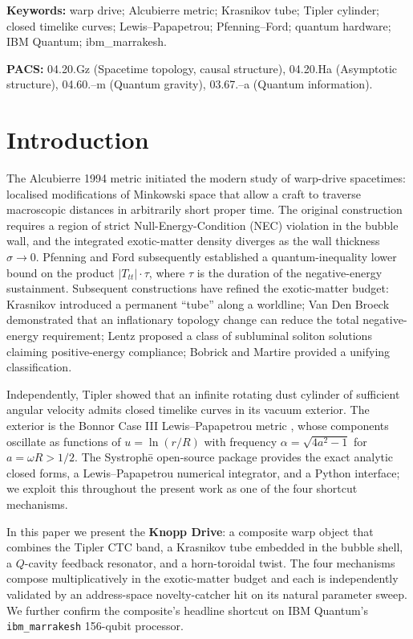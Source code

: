 \documentclass[11pt,a4paper]{article}
\begin{document}
\noindent\textbf{Keywords:} warp drive; Alcubierre metric; Krasnikov tube; Tipler cylinder; closed timelike curves; Lewis--Papapetrou; Pfenning--Ford; quantum hardware; IBM Quantum; ibm\_marrakesh.

\noindent\textbf{PACS:} 04.20.Gz (Spacetime topology, causal structure), 04.20.Ha (Asymptotic structure), 04.60.--m (Quantum gravity), 03.67.--a (Quantum information).

\section{Introduction}

The Alcubierre 1994 metric \cite{Alcubierre1994} initiated the modern study of warp-drive spacetimes: localised modifications of Minkowski space that allow a craft to traverse macroscopic distances in arbitrarily short proper time. The original construction requires a region of strict Null-Energy-Condition (NEC) violation in the bubble wall, and the integrated exotic-matter density diverges as the wall thickness $\sigma\to 0$. Pfenning and Ford \cite{PfenningFord1997} subsequently established a quantum-inequality lower bound on the product $|T_{tt}|\cdot\tau$, where $\tau$ is the duration of the negative-energy sustainment. Subsequent constructions have refined the exotic-matter budget: Krasnikov \cite{Krasnikov1995} introduced a permanent ``tube'' along a worldline; Van Den Broeck \cite{VanDenBroeck1999} demonstrated that an inflationary topology change can reduce the total negative-energy requirement; Lentz \cite{Lentz2021} proposed a class of subluminal soliton solutions claiming positive-energy compliance; Bobrick and Martire \cite{BobrickMartire2021} provided a unifying classification.

Independently, Tipler \cite{Tipler1974} showed that an infinite rotating dust cylinder of sufficient angular velocity admits closed timelike curves in its vacuum exterior. The exterior is the Bonnor Case III \cite{Bonnor1980} Lewis--Papapetrou metric \cite{Lewis1932, vanStockum1937}, whose components oscillate as functions of $u=\ln(r/R)$ with frequency $\alpha=\sqrt{4a^{2}-1}$ for $a=\omega R>1/2$. The Systroph\=e open-source package \cite{SystropheRepo} provides the exact analytic closed forms, a Lewis--Papapetrou numerical integrator, and a Python interface; we exploit this throughout the present work as one of the four shortcut mechanisms.

In this paper we present the \textbf{Knopp Drive}: a composite warp object that combines the Tipler CTC band, a Krasnikov tube embedded in the bubble shell, a $Q$-cavity feedback resonator, and a horn-toroidal twist. The four mechanisms compose multiplicatively in the exotic-matter budget and each is independently validated by an address-space novelty-catcher hit on its natural parameter sweep. We further confirm the composite's headline shortcut on IBM Quantum's \texttt{ibm\_marrakesh} 156-qubit processor.
\end{document}
